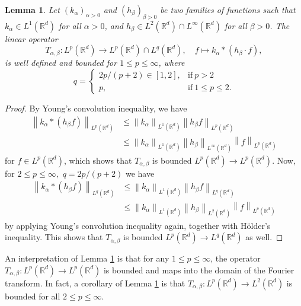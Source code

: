 \documentclass{article}
\newtheorem{lemma}[theorem]{Lemma}
\theoremstyle{definition}
\newcommand{\R}{\mathbb{R}}
\newcommand{\norm}[1]{\left\lVert#1\right\rVert}
\begin{document}
\begin{lemma}
\label{thm:preconbounded}
Let \((k_\alpha)_{\alpha>0}\)
and
\((h_\beta)_{\beta>0}\)
be two families of functions such that 
\(k_\alpha\in L^1(\R^d)\)
for all
\(\alpha>0\), and \({h_\beta}\in
L^2(\R^d)\cap L^\infty(\R^d)\) for all \(\beta>0\).
The linear operator
\begin{equation}
    \label{eq:preconbounded}
    T_{\alpha,\beta}\colon L^p(\R^d)\to L^p(\R^d)\cap L^q(\R^d)
    ,
    \quad
    f\mapsto k_\alpha * (h_\beta\cdot f),
\end{equation}
is well defined and bounded for \(1\leq p \leq \infty\),
where
\begin{equation*}
    q = \begin{cases}
        2 p/(p + 2) \in [1,2],& \text{if}\ p>2\\
        p,&\text{if}\ 1\leq p \leq 2.
    \end{cases}
\end{equation*}

\end{lemma}
\begin{proof}
    By Young's convolution inequality,
    we have
    \begin{align*}
        \norm{k_\alpha * (h_\beta f)}_{L^p(\R^d)}
        &\leq
        \norm{k_\alpha}_{L^1(\R^d)}\norm{h_\beta f}_{L^p(\R^d)}
        \\&
        \leq
        \norm{k_\alpha}_{L^1(\R^d)}\norm{h_\beta}_{L^\infty(\R^d)}\norm{f}_{L^p(\R^d)}
    \end{align*}
    for \(f\in L^p(\R^d)\), which 
    shows that \(T_{\alpha,\beta}\) is bounded \(L^p(\R^d)\to L^p(\R^d)\).
    Now, for \(2\leq p \leq \infty,\)
    \(q = 2p/(p+2)\)
    we have 
    \begin{align*}
        \norm{k_\alpha * (h_\beta f)}_{L^q(\R^d)}
        &\leq
        \norm{k_\alpha}_{L^1(\R^d)}\norm{h_\beta f}_{L^q(\R^d)}
        \\&
        \leq
        \norm{k_\alpha}_{L^1(\R^d)}\norm{h_\beta}_{L^2(\R^d)}\norm{f}_{L^p(\R^d)}
    \end{align*}
    by applying Young's convolution inequality again, together with H\"older's inequality.
    This shows that \(T_{\alpha,\beta}\) is bounded \(L^p(\R^d)\to L^q(\R^d)\) as well.
\end{proof}
An interpretation of Lemma \ref{thm:preconbounded} is that 
for any \(1\leq p \leq \infty\), the operator \(T_{\alpha,\beta}\colon L^p(\R^d)\to L^p(\R^d)\) is bounded and maps into the domain of the Fourier transform.
In fact, a corollary of Lemma \ref{thm:preconbounded} is that \(T_{\alpha,\beta}\colon L^p(\R^d)\to L^2(\R^d)\) is bounded for all \(2\leq p \leq \infty\).
\end{document}

